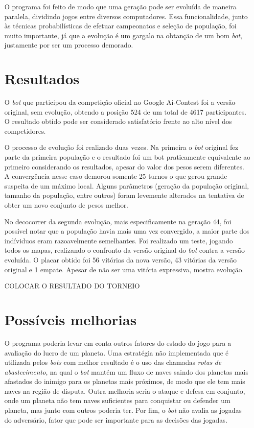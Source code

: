 \documentclass[a4paper,titlepage,11pt]{article}
\begin{document}
O programa foi feito de modo que uma geração pode ser evoluída de maneira paralela, dividindo jogos entre diversos computadores. Essa funcionalidade, junto às técnicas probabilísticas de efetuar campeonatos e seleção de população, foi muito importante, já que a evolução é um gargalo na obtanção de um bom {\em bot}, justamente por ser um processo demorado.

\section{Resultados}
O {\em bot} que participou da competição oficial no Google Ai-Contest foi a versão original, sem evolução, obtendo a posição 524 de um total de 4617 participantes. O resultado obtido pode ser considerado satisfatório frente ao alto nível dos competidores.

O processo de evolução foi realizado duas vezes. Na primeira o {\em bot} original fez parte da primeira população e o resultado foi um bot praticamente equivalente ao primeiro considerando os resultados, apesar do valor dos pesos serem diferentes. A convergência nesse caso demorou somente 25 turnos o que gerou grande suspeita de um máximo local. Alguns parâmetros (geração da população original, tamanho da população, entre outros) foram levemente alterados na tentativa de obter um novo conjunto de pesos melhor.

No decocorrer da segunda evolução, mais especificamente na geração 44, foi possível notar que a população havia mais uma vez convergido, a maior parte dos indíviduos eram razoavelmente semelhantes. Foi realizado um teste, jogando todos os mapas, realizando o confronto da versão original do {\em bot} contra a versão evoluída. O placar obtido foi 56 vitórias da nova versão, 43 vitórias da versão original e 1 empate. Apesar de não ser uma vitória expressiva, mostra evolução.

COLOCAR O RESULTADO DO TORNEIO

\section{Possíveis melhorias}
O programa poderia levar em conta outros fatores do estado do jogo para a avaliação do lucro de um planeta. Uma estratégia não implementada que é utilizada pelos {\em bots} com melhor resultado é o uso das chamadas {\em rotas de abastecimento}, na qual o {\em bot} mantém um fluxo de naves saindo dos planetas mais afastados do inimigo para os planetas mais próximos, de modo que ele tem mais naves na região de disputa. Outra melhoria seria o ataque e defesa em conjunto, onde um planeta não tem naves suficientes para conquistar ou defender um planeta, mas junto com outros poderia ter. Por fim, o {\em bot} não avalia as jogadas do adversário, fator que pode ser importante para as decisões das jogadas.
\end{document}
